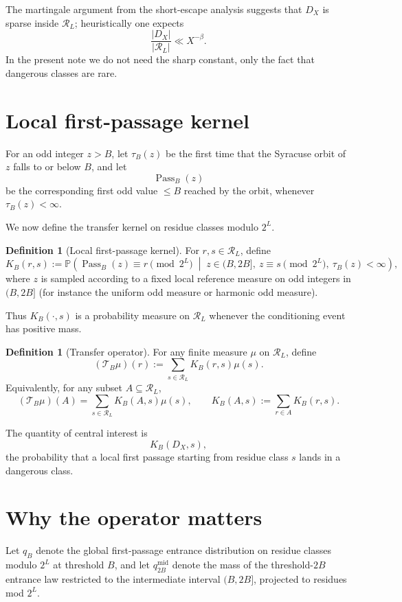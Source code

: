 \documentclass[11pt]{article}
\theoremstyle{definition}
\newtheorem{definition}[theorem]{Definition}
\theoremstyle{remark}
\newcommand{\1}{\mathbf{1}}
\newcommand{\Pass}{\operatorname{Pass}}
\newcommand{\Res}{\mathcal R_L}
\newcommand{\DX}{D_X}
\newcommand{\KB}{K_B}
\newcommand{\TB}{\mathcal T_B}
\begin{document}
The martingale argument from the short-escape analysis suggests that $\DX$ is sparse inside $\Res$; heuristically one expects
\[
\frac{|\DX|}{|\Res|}\ll X^{-\beta}.
\]
In the present note we do not need the sharp constant, only the fact that dangerous classes are rare.

\section{Local first-passage kernel}

For an odd integer $z>B$, let $\tau_B(z)$ be the first time that the Syracuse orbit of $z$ falls to or below $B$, and let
\[
\Pass_B(z)
\]
be the corresponding first odd value $\le B$ reached by the orbit, whenever $\tau_B(z)<\infty$.

We now define the transfer kernel on residue classes modulo $2^L$.

\begin{definition}[Local first-passage kernel]
For $r,s\in \Res$, define
\[
\KB(r,s)
:=
\mathbb{P}\!\left(
\Pass_B(z)\equiv r \!\!\!\!\pmod{2^L}
\;\middle|\;
z\in(B,2B],\ z\equiv s\!\!\!\!\pmod{2^L},\ \tau_B(z)<\infty
\right),
\]
where $z$ is sampled according to a fixed local reference measure on odd integers in $(B,2B]$ (for instance the uniform odd measure or harmonic odd measure).
\end{definition}

Thus $\KB(\cdot,s)$ is a probability measure on $\Res$ whenever the conditioning event has positive mass.

\begin{definition}[Transfer operator]
For any finite measure $\mu$ on $\Res$, define
\[
(\TB\mu)(r):=\sum_{s\in\Res}\KB(r,s)\mu(s).
\]
Equivalently, for any subset $A\subseteq \Res$,
\[
(\TB\mu)(A)=\sum_{s\in\Res}\KB(A,s)\mu(s),
\qquad
\KB(A,s):=\sum_{r\in A}\KB(r,s).
\]
\end{definition}

The quantity of central interest is
\[
\KB(\DX,s),
\]
the probability that a local first passage starting from residue class $s$ lands in a dangerous class.

\section{Why the operator matters}

Let $q_B$ denote the global first-passage entrance distribution on residue classes modulo $2^L$ at threshold $B$, and let $q_{2B}^{\mathrm{mid}}$ denote the mass of the threshold-$2B$ entrance law restricted to the intermediate interval $(B,2B]$, projected to residues mod $2^L$.
\end{document}
